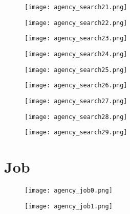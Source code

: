 \documentclass[11 pt, a4paper]{article}
\begin{document}
\begin{figure}[H]
\centering
\texttt{[image: agency\_search21.png]}
\end{figure}


\clearpage
\begin{figure}[H]
\centering
\texttt{[image: agency\_search22.png]}
\end{figure}


\begin{figure}[H]
\centering
\texttt{[image: agency\_search23.png]}
\end{figure}


\clearpage
\begin{figure}[H]
\centering
\texttt{[image: agency\_search24.png]}
\end{figure}


\begin{figure}[H]
\centering
\texttt{[image: agency\_search25.png]}
\end{figure}


\clearpage
\begin{figure}[H]
\centering
\texttt{[image: agency\_search26.png]}
\end{figure}


\begin{figure}[H]
\centering
\texttt{[image: agency\_search27.png]}
\end{figure}


\clearpage
\begin{figure}[H]
\centering
\texttt{[image: agency\_search28.png]}
\end{figure}


\begin{figure}[H]
\centering
\texttt{[image: agency\_search29.png]}
\end{figure}


\section{Job}

\begin{figure}[H]
\centering
\texttt{[image: agency\_job0.png]}
\end{figure}


\begin{figure}[H]
\centering
\texttt{[image: agency\_job1.png]}
\end{figure}
\end{document}
